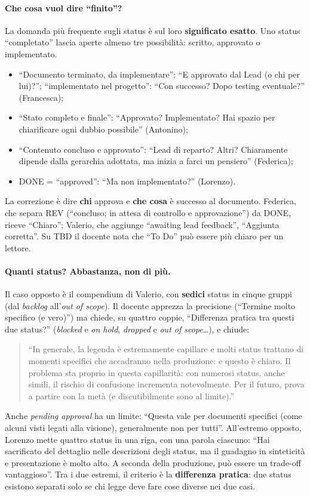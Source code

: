 \paragraph{Che cosa vuol dire ``finito''?} La domanda più frequente sugli
status è sul loro \textbf{significato esatto}. Uno status ``completato''
lascia aperte almeno tre possibilità: scritto, approvato o implementato.
\begin{itemize}
  \item ``Documento terminato, da implementare'': ``E approvato dal Lead (o
        chi per lui)?''; ``implementato nel progetto'': ``Con successo? Dopo
        testing eventuale?'' (Francesca);
  \item ``Stato completo e finale'': ``Approvato? Implementato? Hai spazio per
        chiarificare ogni dubbio possibile'' (Antonino);
  \item ``Contenuto concluso e approvato'': ``Lead di reparto? Altri?
        Chiaramente dipende dalla gerarchia adottata, ma inizia a farci un
        pensiero'' (Federica);
  \item DONE = ``approved'': ``Ma non implementato?'' (Lorenzo).
\end{itemize}
La correzione è dire \textbf{chi} approva e \textbf{che cosa} è successo al
documento. Federica, che separa REV (``concluso; in attesa di controllo e
approvazione'') da DONE, riceve ``Chiaro''; Valerio, che aggiunge ``awaiting
lead feedback'', ``Aggiunta corretta''. Su TBD il docente nota che ``To Do''
può essere più chiaro per un lettore.

\paragraph{Quanti status? Abbastanza, non di più.} Il caso opposto è il
compendium di Valerio, con \textbf{sedici} status in cinque gruppi (dal
\emph{backlog} all'\emph{out of scope}). Il docente apprezza la precisione
(``Termine molto specifico (e vero)'') ma chiede, su quattro coppie,
``Differenza pratica tra questi due status?'' (\emph{blocked} e \emph{on
hold}, \emph{dropped} e \emph{out of scope}\dots), e chiude:
\begin{quote}
  ``In generale, la legenda è estremamente capillare e molti status trattano
  di momenti specifici che accadranno nella produzione: e questo è chiaro.
  Il problema sta proprio in questa capillarità: con numerosi status, anche
  simili, il rischio di confusione incrementa notevolmente. Per il futuro,
  prova a partire con la metà (e discutibilmente sono al limite).''
\end{quote}
Anche \emph{pending approval} ha un limite: ``Questa vale per documenti
specifici (come alcuni visti legati alla visione), generalmente non per
tutti''. All'estremo opposto, Lorenzo mette quattro status in una riga, con
una parola ciascuno: ``Hai sacrificato del dettaglio nelle descrizioni degli
status, ma il guadagno in sinteticità e presentazione è molto alto. A seconda
della produzione, può essere un trade-off vantaggioso''. Tra i due estremi,
il criterio è la \textbf{differenza pratica}: due status esistono separati
solo se chi legge deve fare cose diverse nei due casi.

